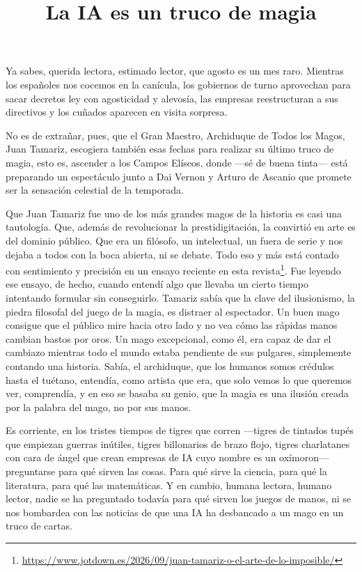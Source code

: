 \documentclass[11pt,a4paper]{article}
\title{La IA es un truco de magia}
\author{}
\date{}
\begin{document}
\maketitle

Ya sabes, querida lectora, estimado lector, que agosto es un mes raro. Mientras los españoles nos cocemos en la canícula, los gobiernos de turno aprovechan para sacar decretos ley con agosticidad y alevosía, las empresas reestructuran a sus directivos y los cuñados aparecen en visita sorpresa.

No es de extrañar, pues, que el Gran Maestro, Archiduque de Todos los Magos, Juan Tamariz, escogiera también esas fechas para realizar su último truco de magia, esto es, ascender a los Campos Elíseos, donde ---sé de buena tinta--- está preparando un espectáculo junto a Dai Vernon y Arturo de Ascanio que promete ser la sensación celestial de la temporada.

Que Juan Tamariz fue uno de los más grandes magos de la historia es casi una tautología. Que, además de revolucionar la prestidigitación, la convirtió en arte es del dominio público. Que era un filósofo, un intelectual, un fuera de serie y nos dejaba a todos con la boca abierta, ni se debate. Todo eso y más está contado con sentimiento y precisión en un ensayo reciente en esta revista\footnote{\url{https://www.jotdown.es/2026/09/juan-tamariz-o-el-arte-de-lo-imposible/}}. Fue leyendo ese ensayo, de hecho, cuando entendí algo que llevaba un cierto tiempo intentando formular sin conseguirlo. Tamariz sabía que la clave del ilusionismo, la piedra filosofal del juego de la magia, es distraer al espectador. Un buen mago consigue que el público mire hacia otro lado y no vea cómo las rápidas manos cambian bastos por oros. Un mago excepcional, como él, era capaz de dar el cambiazo mientras todo el mundo estaba pendiente de sus pulgares, simplemente contando una historia. Sabía, el archiduque, que los humanos somos crédulos hasta el tuétano, entendía, como artista que era, que solo vemos lo que queremos ver, comprendía, y en eso se basaba su genio, que la magia es una ilusión creada por la palabra del mago, no por sus manos.

Es corriente, en los tristes tiempos de tigres que corren ---tigres de tintados tupés que empiezan guerras inútiles, tigres billonarios de brazo flojo, tigres charlatanes con cara de ángel que crean empresas de IA cuyo nombre es un oxímoron--- preguntarse para qué sirven las cosas. Para qué sirve la ciencia, para qué la literatura, para qué las matemáticas. Y en cambio, humana lectora, humano lector, nadie se ha preguntado todavía para qué sirven los juegos de manos, ni se nos bombardea con las noticias de que una IA ha desbancado a un mago en un truco de cartas.
\end{document}
